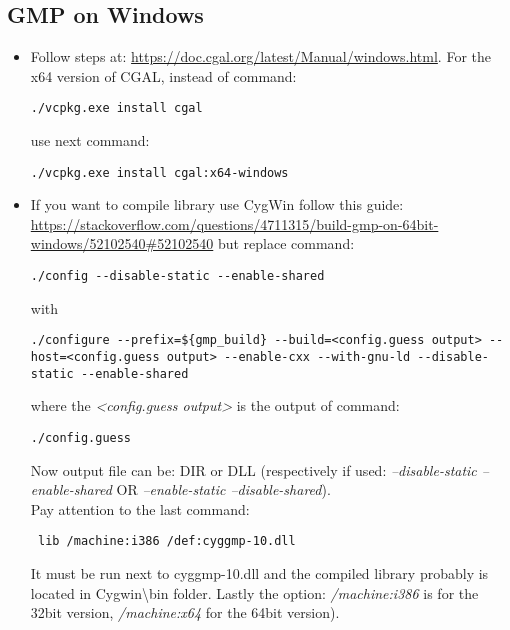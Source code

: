 \documentclass[10pt, english, openany]{report}
\begin{document}
\begin{appendices}
\subsection{GMP on Windows}
\begin{itemize}
\item Follow steps at: \href{https://doc.cgal.org/latest/Manual/windows.html}{https://doc.cgal.org/latest/Manual/windows.html}. For the x64 version of CGAL, instead of command:
\begin{lstlisting}
./vcpkg.exe install cgal
\end{lstlisting}
 use next command:
\begin{lstlisting}
./vcpkg.exe install cgal:x64-windows   
\end{lstlisting}
\item If you want to compile library use CygWin follow this guide: \href{https://stackoverflow.com/questions/4711315/build-gmp-on-64bit-windows/52102540#52102540}{https://stackoverflow.com/questions/4711315/build-gmp-on-64bit-windows/52102540\#52102540} but replace command:
\begin{lstlisting}
./config --disable-static --enable-shared
\end{lstlisting}
with
\begin{lstlisting}
./configure --prefix=${gmp_build} --build=<config.guess output> --host=<config.guess output> --enable-cxx --with-gnu-ld --disable-static --enable-shared
\end{lstlisting}
where the \textit{<config.guess output>} is the output of command: 
\begin{lstlisting}
./config.guess
\end{lstlisting}
Now output file can be: DIR or DLL (respectively if used: \textit{--disable-static --enable-shared} OR \textit{--enable-static --disable-shared}).\\
Pay attention to the last command:
\begin{lstlisting}
 lib /machine:i386 /def:cyggmp-10.dll 
\end{lstlisting}
It must be run next to cyggmp-10.dll and the compiled library probably is located in Cygwin\textbackslash bin folder.
Lastly the option: \textit{/machine:i386} is for the 32bit version, \textit{/machine:x64} for the 64bit version).
\end{itemize}


\end{appendices}
\end{document}
